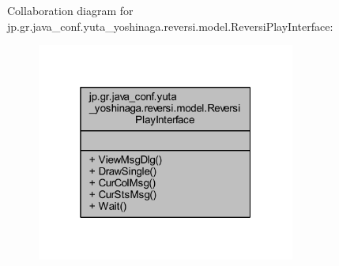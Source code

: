 Collaboration diagram for jp.\+gr.\+java\+\_\+conf.\+yuta\+\_\+yoshinaga.\+reversi.\+model.\+Reversi\+Play\+Interface\+:
\nopagebreak
\begin{figure}[H]
\begin{center}
\leavevmode
\includegraphics[width=241pt]{interfacejp_1_1gr_1_1java__conf_1_1yuta__yoshinaga_1_1reversi_1_1model_1_1_reversi_play_interface__coll__graph}
\end{center}
\end{figure}
